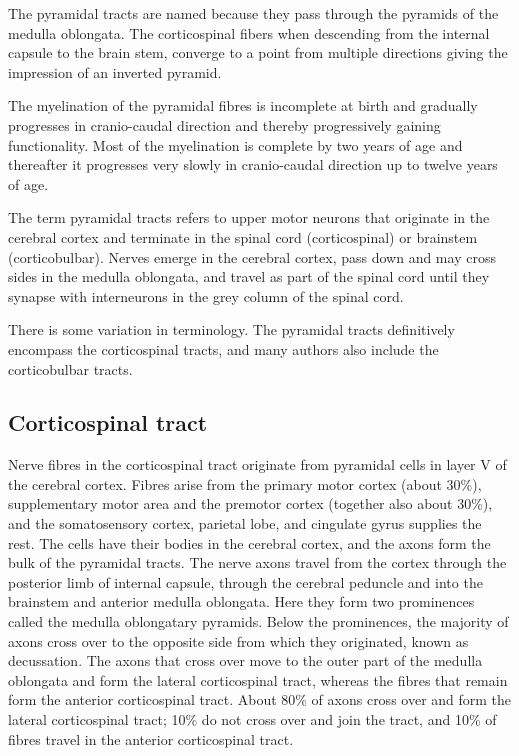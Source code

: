 \documentclass[]{book}
\begin{document}
The pyramidal tracts are named because they pass through the pyramids of the medulla oblongata. The corticospinal fibers when descending from the internal capsule to the brain stem, converge to a point from multiple directions giving the impression of an inverted pyramid.

The myelination of the pyramidal fibres is incomplete at birth and gradually progresses in cranio-caudal direction and thereby progressively gaining functionality. Most of the myelination is complete by two years of age and thereafter it progresses very slowly in cranio-caudal direction up to twelve years of age.

The term pyramidal tracts refers to upper motor neurons that originate in the cerebral cortex and terminate in the spinal cord (corticospinal) or brainstem (corticobulbar). Nerves emerge in the cerebral cortex, pass down and may cross sides in the medulla oblongata, and travel as part of the spinal cord until they synapse with interneurons in the grey column of the spinal cord.

There is some variation in terminology. The pyramidal tracts definitively encompass the corticospinal tracts, and many authors also include the corticobulbar tracts.

\hypertarget{corticospinal-tract}{%
\subsection{Corticospinal tract}\label{corticospinal-tract}}

Nerve fibres in the corticospinal tract originate from pyramidal cells in layer V of the cerebral cortex. Fibres arise from the primary motor cortex (about 30\%), supplementary motor area and the premotor cortex (together also about 30\%), and the somatosensory cortex, parietal lobe, and cingulate gyrus supplies the rest. The cells have their bodies in the cerebral cortex, and the axons form the bulk of the pyramidal tracts. The nerve axons travel from the cortex through the posterior limb of internal capsule, through the cerebral peduncle and into the brainstem and anterior medulla oblongata. Here they form two prominences called the medulla oblongatary pyramids. Below the prominences, the majority of axons cross over to the opposite side from which they originated, known as decussation. The axons that cross over move to the outer part of the medulla oblongata and form the lateral corticospinal tract, whereas the fibres that remain form the anterior corticospinal tract. About 80\% of axons cross over and form the lateral corticospinal tract; 10\% do not cross over and join the tract, and 10\% of fibres travel in the anterior corticospinal tract.
\end{document}
